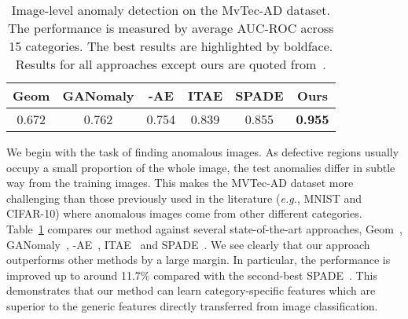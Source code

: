 \documentclass[final]{cvpr}
\begin{document}
{\begin{table}[!t]
	\centering
	\caption{Image-level anomaly detection on the MvTec-AD dataset. The performance is measured by average AUC-ROC across 15 categories. The best results are highlighted by boldface. Results for all approaches except ours are quoted from~\cite{Cohen2020}.}
	\label{tab1}
	\vspace{0.5em}
\begin{tabular}{cccccc}
			\hline
			Geom  & GANomaly & -AE & ITAE  & SPADE & Ours\\
			\hline
			0.672 & 0.762  & 0.754  & 0.839 & 0.855 & \textbf{0.955} \\
			\hline
		\end{tabular}
\end{table}

We begin with the task of finding anomalous images. As defective regions usually occupy a small proportion of the whole image, the test anomalies differ in subtle way from the training images. This makes the MVTec-AD dataset more challenging than those previously used in the literature (\textit{e.g.}, MNIST and CIFAR-10) where anomalous images come from other different categories. Table~\ref{tab1} compares our method against several state-of-the-art approaches, Geom~\cite{Golan2018}, GANomaly~\cite{Akcay2018}, -AE~\cite{Aytekin2018}, ITAE~\cite{Huang2020} and SPADE~\cite{Cohen2020}. We see clearly that our approach outperforms other methods by a large margin. In particular, the performance is improved up to around 11.7\% compared with the second-best SPADE~\cite{Cohen2020}. This demonstrates that our method can learn category-specific features which are superior to the generic features directly transferred from image classification.



 

}
\end{document}

